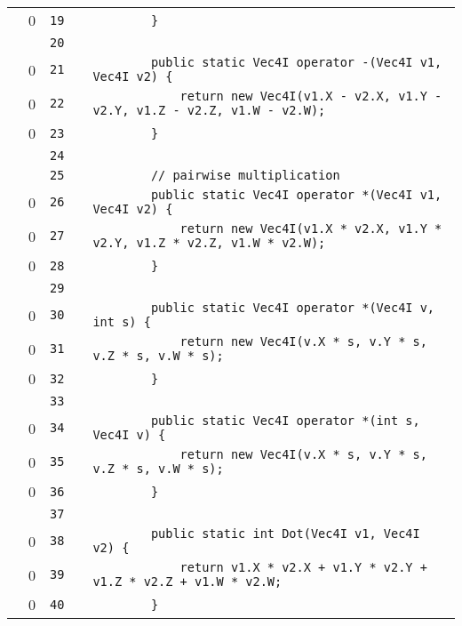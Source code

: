 \documentclass[a4paper,landscape,10pt]{article}
\begin{document}
\begin{longtable}[l]{lrrll}
\cellcolor{red} & 0 & \verb~19~ & & \verb~        }~\\
\cellcolor{gray} &  & \verb~20~ & & \verb~~\\
\cellcolor{red} & 0 & \verb~21~ & & \verb~        public static Vec4I operator -(Vec4I v1, Vec4I v2) {~\\
\cellcolor{red} & 0 & \verb~22~ & & \verb~            return new Vec4I(v1.X - v2.X, v1.Y - v2.Y, v1.Z - v2.Z, v1.W - v2.W);~\\
\cellcolor{red} & 0 & \verb~23~ & & \verb~        }~\\
\cellcolor{gray} &  & \verb~24~ & & \verb~~\\
\cellcolor{gray} &  & \verb~25~ & & \verb~        // pairwise multiplication~\\
\cellcolor{red} & 0 & \verb~26~ & & \verb~        public static Vec4I operator *(Vec4I v1, Vec4I v2) {~\\
\cellcolor{red} & 0 & \verb~27~ & & \verb~            return new Vec4I(v1.X * v2.X, v1.Y * v2.Y, v1.Z * v2.Z, v1.W * v2.W);~\\
\cellcolor{red} & 0 & \verb~28~ & & \verb~        }~\\
\cellcolor{gray} &  & \verb~29~ & & \verb~~\\
\cellcolor{red} & 0 & \verb~30~ & & \verb~        public static Vec4I operator *(Vec4I v, int s) {~\\
\cellcolor{red} & 0 & \verb~31~ & & \verb~            return new Vec4I(v.X * s, v.Y * s, v.Z * s, v.W * s);~\\
\cellcolor{red} & 0 & \verb~32~ & & \verb~        }~\\
\cellcolor{gray} &  & \verb~33~ & & \verb~~\\
\cellcolor{red} & 0 & \verb~34~ & & \verb~        public static Vec4I operator *(int s, Vec4I v) {~\\
\cellcolor{red} & 0 & \verb~35~ & & \verb~            return new Vec4I(v.X * s, v.Y * s, v.Z * s, v.W * s);~\\
\cellcolor{red} & 0 & \verb~36~ & & \verb~        }~\\
\cellcolor{gray} &  & \verb~37~ & & \verb~~\\
\cellcolor{red} & 0 & \verb~38~ & & \verb~        public static int Dot(Vec4I v1, Vec4I v2) {~\\
\cellcolor{red} & 0 & \verb~39~ & & \verb~            return v1.X * v2.X + v1.Y * v2.Y + v1.Z * v2.Z + v1.W * v2.W;~\\
\cellcolor{red} & 0 & \verb~40~ & & \verb~        }~\\

\end{longtable}
\end{document}
